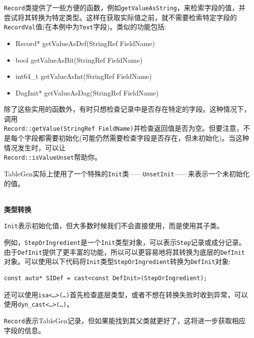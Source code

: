 \texttt{Record}类提供了一些方便的函数，例如\texttt{getValueAsString}，来检索字段的值，并尝试将其转换为特定类型。这样在获取实际值之前，就不需要检索特定字段的\texttt{RecordVal}值(在本例中为\texttt{Text}字段)。类似的功能包括:

\begin{itemize}
\tt
\item Record* getValueAsDef(StringRef FieldName)
\item bool getValueAsBit(StringRef FieldName)
\item int64\_t getValueAsInt(StringRef FieldName)
\item DagInit* getValueAsDag(StringRef FieldName)
\end{itemize}

除了这些实用的函数外，有时只想检查记录中是否存在特定的字段。这种情况下，调用\\\texttt{Record::getValue(StringRef FieldName)}并检查返回值是否为空。但要注意，不是每个字段都需要初始化(可能仍然需要检查字段是否存在，但未初始化)。当这种情况发生时，可以让\\\texttt{Record::isValueUnset}帮助你。

\begin{tcolorbox}[colback=blue!5!white,colframe=blue!75!black, fonttitle=\bfseries,title=Note]
\hspace*{0.7cm}TableGen实际上使用了一个特殊的\texttt{Init}类——\texttt{UnsetInit}——来表示一个未初始化的值。
\end{tcolorbox}

\hspace*{\fill} \\ %
\noindent
\textbf{类型转换}

\texttt{Init}表示初始化值，但大多数时候我们不会直接使用，而是使用其子类。

例如，\texttt{StepOrIngredient}是一个\texttt{Init}类型对象，可以表示\texttt{Step}记录或成分记录。由于\texttt{DefInit}提供了更丰富的功能，所以可以更容易地将其转换为底层的\texttt{DefInit}对象。可以使用以下代码将\texttt{Init}类型\texttt{StepOrIngredient}转换为\texttt{DefInit}对象:

\begin{lstlisting}[style=styleCXX]
const auto* SIDef = cast<const DefInit>(StepOrIngredient);
\end{lstlisting}

还可以使用\texttt{isa<…>(…)}首先检查底层类型，或者不想在转换失败时收到异常，可以使用\texttt{dyn\_cast<…>(…)}。

\texttt{Record}表示TableGen记录，但如果能找到其父类就更好了，这将进一步获取相应字段的信息。

